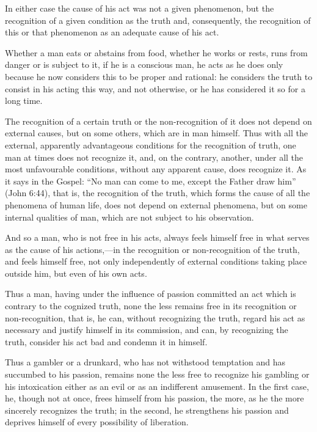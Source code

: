 \documentclass{book}
\begin{document}
In either case the cause of his act was not a given phenomenon, but the recognition of a given condition as the truth and, consequently, the recognition of this or that phenomenon as an adequate cause of his act.

Whether a man eats or abstains from food, whether he works or rests, runs from danger or is subject to it, if he is a conscious man, he acts as he does only because he now considers this to be proper and rational: he considers the truth to consist in his acting this way, and not otherwise, or he has considered it so for a long time.

The recognition of a certain truth or the non-recognition of it does not depend on external causes, but on some others, which are in man himself. Thus with all the external, apparently advantageous conditions for the recognition of truth, one man at times does not recognize it, and, on the contrary, another, under all the most unfavourable conditions, without any apparent cause, does recognize it. As it says in the Gospel: “No man can come to me, except the Father draw him” (John 6:44), that is, the recognition of the truth, which forms the cause of all the phenomena of human life, does not depend on external phenomena, but on some internal qualities of man, which are not subject to his observation.

And so a man, who is not free in his acts, always feels himself free in what serves as the cause of his actions,—in the recognition or non-recognition of the truth, and feels himself free, not only independently of external conditions taking place outside him, but even of his own acts.

Thus a man, having under the influence of passion committed an act which is contrary to the cognized truth, none the less remains free in its recognition or non-recognition, that is, he can, without recognizing the truth, regard his act as necessary and justify himself in its commission, and can, by recognizing the truth, consider his act bad and condemn it in himself.

Thus a gambler or a drunkard, who has not withstood temptation and has succumbed to his passion, remains none the less free to recognize his gambling or his intoxication either as an evil or as an indifferent amusement. In the first case, he, though not at once, frees himself from his passion, the more, as he the more sincerely recognizes the truth; in the second, he strengthens his passion and deprives himself of every possibility of liberation.
\end{document}
